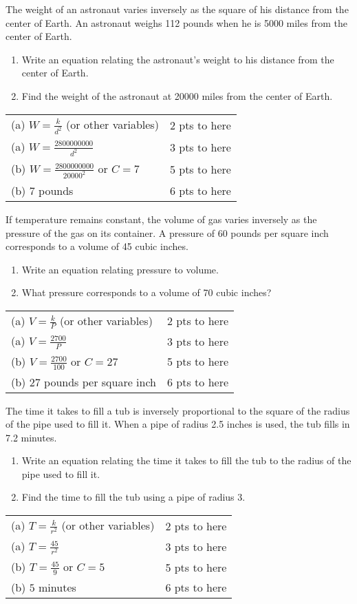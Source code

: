 {
	The weight of an astronaut varies inversely as the square of his distance from the center of Earth. An astronaut weighs 112 pounds when he is 5000 miles from the center of Earth.
	\begin{enumerate}
	\item Write an equation relating the astronaut's weight to his distance from the center of Earth.
	\item Find the weight of the astronaut at 20000 miles from the center of Earth.
	\end{enumerate}
}
{
	\begin{tabular}{l r}
	(a) $W = \frac{k}{d^2}$ (or other variables) &  2 pts to here\\
	(a) $W=\frac{2800000000}{d^2}$ & 3 pts to here\\
	(b) $W = \frac{2800000000}{20000^2}$ or $C=7$ & 5 pts to here\\
	(b) $7$ pounds & 6 pts to here
	\end{tabular}
}

{
	If temperature remains constant, the volume of gas varies inversely as the pressure of the gas on its container. A pressure of 60 pounds per square inch corresponds to a volume of 45 cubic inches.
	\begin{enumerate}
	\item Write an equation relating pressure to volume.
	\item What pressure corresponds to a volume of 70 cubic inches?
	\end{enumerate}
}
{
	\begin{tabular}{l r}
	(a) $V = \frac{k}{P}$ (or other variables) & 2 pts to here\\
	(a) $V = \frac{2700}{P}$ & 3 pts to here\\
	(b) $V = \frac{2700}{100}$ or $C=27$ & 5 pts to here\\
	(b) $27$ pounds per square inch & 6 pts to here
	\end{tabular}
}

{
	The time it takes to fill a tub is inversely proportional to the square of the radius of the pipe used to fill it. When a pipe of radius 2.5 inches is used, the tub fills in 7.2 minutes. 
	\begin{enumerate}
	\item Write an equation relating the time it takes to fill the tub to the radius of the pipe used to fill it.
	\item Find the time to fill the tub using a pipe of radius 3.
	\end{enumerate}
}
{
	\begin{tabular}{l r}
	(a) $T = \frac{k}{r^2}$ (or other variables) & 2 pts to here\\
	(a) $T = \frac{45}{r^2}$ & 3 pts to here\\
	(b) $T = \frac{45}{9}$ or $C=5$ & 5 pts to here\\
	(b) $5$ minutes & 6 pts to here
	\end{tabular}
}

